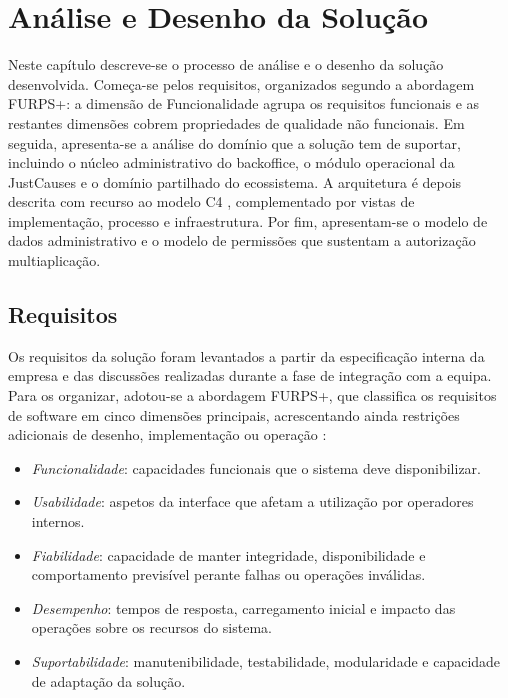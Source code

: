 \chapter{Análise e Desenho da Solução}
\label{cap:analise_desenho}

Neste capítulo descreve-se o processo de análise e o desenho da solução desenvolvida. Começa-se pelos requisitos, organizados segundo a abordagem \gls{FURPS+}: a dimensão de Funcionalidade agrupa os requisitos funcionais e as restantes dimensões cobrem propriedades de qualidade não funcionais. Em seguida, apresenta-se a análise do domínio que a solução tem de suportar, incluindo o núcleo administrativo do backoffice, o módulo operacional da JustCauses e o domínio partilhado do ecossistema. A arquitetura é depois descrita com recurso ao modelo C4 \cite{C4Model}, complementado por vistas de implementação, processo e infraestrutura. Por fim, apresentam-se o modelo de dados administrativo e o modelo de permissões que sustentam a autorização multiaplicação.


\section{Requisitos}
\label{sec:requisitos}

Os requisitos da solução foram levantados a partir da especificação interna da empresa \cite{BackofficeSpec} e das discussões realizadas durante a fase de integração com a equipa. Para os organizar, adotou-se a abordagem \gls{FURPS+}, que classifica os requisitos de software em cinco dimensões principais, acrescentando ainda restrições adicionais de desenho, implementação ou operação \cite{Rashid2024FURPSMoSCoW}:

\begin{itemize}
  \item \textit{Funcionalidade}: capacidades funcionais que o sistema deve disponibilizar.
  \item \textit{Usabilidade}: aspetos da interface que afetam a utilização por operadores internos.
  \item \textit{Fiabilidade}: capacidade de manter integridade, disponibilidade e comportamento previsível perante falhas ou operações inválidas.
  \item \textit{Desempenho}: tempos de resposta, carregamento inicial e impacto das operações sobre os recursos do sistema.
  \item \textit{Suportabilidade}: manutenibilidade, testabilidade, modularidade e capacidade de adaptação da solução.
\end{itemize}

